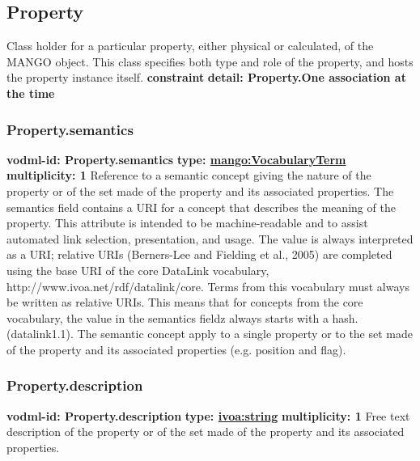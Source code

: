   \subsection{Property}
    \label{sect:Property}
    Class holder for a particular property, either physical or calculated, of the MANGO object. This class specifies both type and role of the property, and hosts the property instance itself.
    \noindent \textbf{constraint} \newline
    \indent    \textbf{detail: Property.One association at the time
    }\newline

    \subsubsection{Property.semantics}
    \textbf{vodml-id: Property.semantics} \newline
    \textbf{type: \hyperref[sect:VocabularyTerm]{mango:VocabularyTerm}} \newline
    \textbf{multiplicity: 1} \newline
    Reference to a semantic concept giving the nature of the property or of the set made of the property and its associated properties. The semantics field contains a URI for a concept that describes the meaning of the property. This attribute is intended to be machine-readable and to assist automated link selection, presentation, and usage. The value is always interpreted as a URI; relative URIs (Berners-Lee and Fielding et al., 2005) are completed using the base URI of the core DataLink vocabulary, http://www.ivoa.net/rdf/datalink/core. Terms from this vocabulary must always be written as relative URIs. This means that for concepts from the core vocabulary, the value in the semantics fieldz always starts with a hash. (datalink1.1). The semantic concept apply to a single property or to the set made of the property and its associated properties (e.g. position and flag).

    \subsubsection{Property.description}
    \textbf{vodml-id: Property.description} \newline
    \textbf{type: \hyperref[sect:ivoa]{ivoa:string}} \newline
    \textbf{multiplicity: 1} \newline
    Free text description of the property or of the set made of the property and its associated properties.

